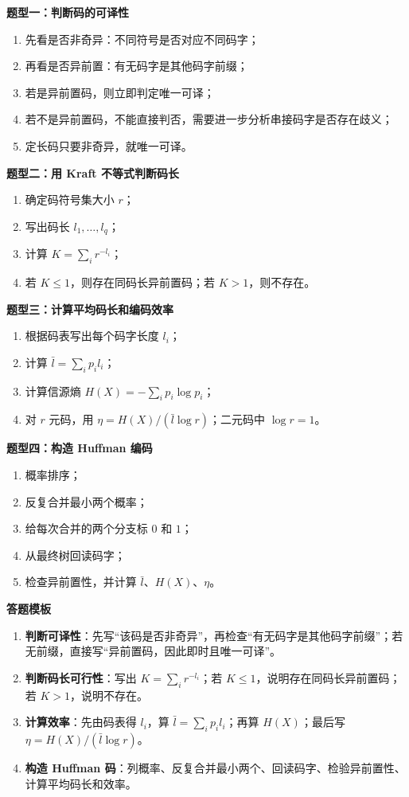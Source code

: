 \textbf{题型一：判断码的可译性}
\begin{enumerate}
  \item 先看是否非奇异：不同符号是否对应不同码字；
  \item 再看是否异前置：有无码字是其他码字前缀；
  \item 若是异前置码，则立即判定唯一可译；
  \item 若不是异前置码，不能直接判否，需要进一步分析串接码字是否存在歧义；
  \item 定长码只要非奇异，就唯一可译。
\end{enumerate}

\textbf{题型二：用 Kraft 不等式判断码长}
\begin{enumerate}
  \item 确定码符号集大小 $r$；
  \item 写出码长 $l_1,\dots,l_q$；
  \item 计算 $K=\sum_i r^{-l_i}$；
  \item 若 $K\le1$，则存在同码长异前置码；若 $K>1$，则不存在。
\end{enumerate}

\textbf{题型三：计算平均码长和编码效率}
\begin{enumerate}
  \item 根据码表写出每个码字长度 $l_i$；
  \item 计算 $\bar l=\sum_i p_i l_i$；
  \item 计算信源熵 $H(X)=-\sum_i p_i\log p_i$；
  \item 对 $r$ 元码，用 $\eta=H(X)/(\bar l\log r)$；二元码中 $\log r=1$。
\end{enumerate}

\textbf{题型四：构造 Huffman 编码}
\begin{enumerate}
  \item 概率排序；
  \item 反复合并最小两个概率；
  \item 给每次合并的两个分支标 $0$ 和 $1$；
  \item 从最终树回读码字；
  \item 检查异前置性，并计算 $\bar l$、$H(X)$、$\eta$。
\end{enumerate}

\textbf{答题模板}
\begin{enumerate}
  \item \textbf{判断可译性}：先写“该码是否非奇异”，再检查“有无码字是其他码字前缀”；若无前缀，直接写“异前置码，因此即时且唯一可译”。
  \item \textbf{判断码长可行性}：写出 $K=\sum_i r^{-l_i}$；若 $K\le1$，说明存在同码长异前置码；若 $K>1$，说明不存在。
  \item \textbf{计算效率}：先由码表得 $l_i$，算 $\bar l=\sum_i p_i l_i$；再算 $H(X)$；最后写 $\eta=H(X)/(\bar l\log r)$。
  \item \textbf{构造 Huffman 码}：列概率、反复合并最小两个、回读码字、检验异前置性、计算平均码长和效率。
\end{enumerate}

